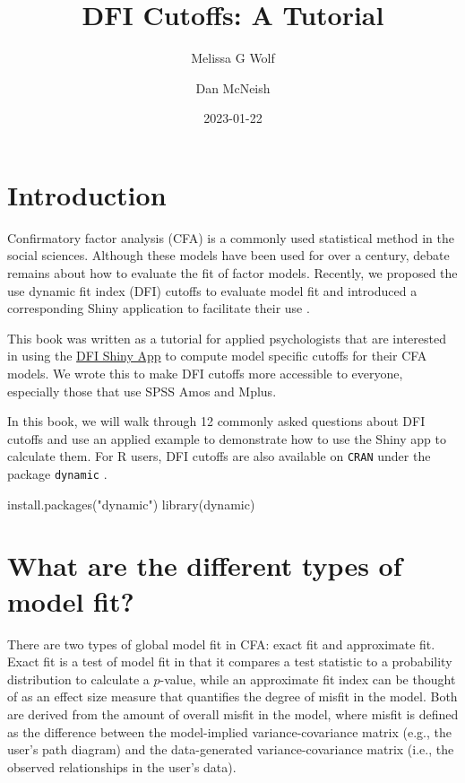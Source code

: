 \documentclass[
]{book}
\title{DFI Cutoffs: A Tutorial}
\author{Melissa G Wolf \and Dan McNeish}
\date{2023-01-22}
\newenvironment{Shaded}{\begin{snugshade}}{\end{snugshade}}
\newcommand{\FunctionTok}[1]{\textcolor[rgb]{0.00,0.00,0.00}{#1}}
\newcommand{\NormalTok}[1]{#1}
\newcommand{\StringTok}[1]{\textcolor[rgb]{0.31,0.60,0.02}{#1}}
\begin{document}
\maketitle

{
\setcounter{tocdepth}{1}
\tableofcontents
}
\hypertarget{introduction}{%
\chapter*{Introduction}\label{introduction}}

Confirmatory factor analysis (CFA) is a commonly used statistical method in the social sciences. Although these models have been used for over a century, debate remains about how to evaluate the fit of factor models. Recently, we proposed the use dynamic fit index (DFI) cutoffs to evaluate model fit \citep{mcneish_dynamic_2021, mcneish_dynamic_2022} and introduced a corresponding Shiny application to facilitate their use \citep{wolf_dynamic_2020}.

This book was written as a tutorial for applied psychologists that are interested in using the \href{www.dynamicfit.app}{DFI Shiny App} to compute model specific cutoffs for their CFA models. We wrote this to make DFI cutoffs more accessible to everyone, especially those that use SPSS Amos and Mplus.

In this book, we will walk through 12 commonly asked questions about DFI cutoffs and use an applied example to demonstrate how to use the Shiny app to calculate them. For R users, DFI cutoffs are also available on \texttt{CRAN} under the package \texttt{dynamic} \citep{R-dynamic}.

\begin{Shaded}
\begin{Highlighting}[]
\FunctionTok{install.packages}\NormalTok{(}\StringTok{"dynamic"}\NormalTok{)}
\FunctionTok{library}\NormalTok{(dynamic)}
\end{Highlighting}
\end{Shaded}

\hypertarget{fit-types}{%
\chapter{What are the different types of model fit?}\label{fit-types}}

There are two types of global model fit in CFA: exact fit and approximate fit. Exact fit is a test of model fit in that it compares a test statistic to a probability distribution to calculate a \(p\)-value, while an approximate fit index can be thought of as an effect size measure that quantifies the degree of misfit in the model. Both are derived from the amount of overall misfit in the model, where misfit is defined as the difference between the model-implied variance-covariance matrix (e.g., the user's path diagram) and the data-generated variance-covariance matrix (i.e., the observed relationships in the user's data).
\end{document}
